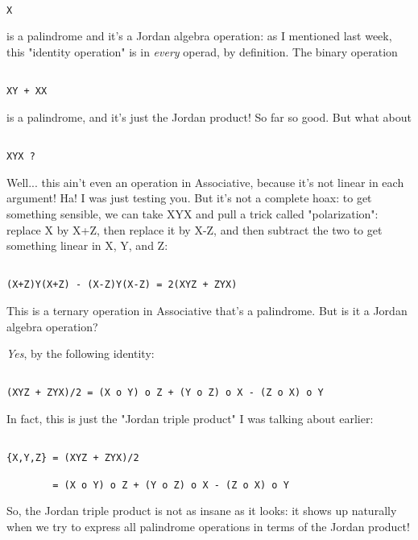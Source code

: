 \begin{verbatim}

X
\end{verbatim}
    
is a palindrome and it's a Jordan algebra operation: as I mentioned last
week, this "identity operation" is in \emph{every} 
operad, by definition.
The binary operation


\begin{verbatim}

XY + XX
\end{verbatim}
    
is a palindrome, and it's just the Jordan product!  So far so good.  
But what about


\begin{verbatim}

XYX ?
\end{verbatim}
    
Well... this ain't even an operation in Associative, because it's not
linear in each argument!  Ha!  I was just testing you.  But it's not a
complete hoax: to get something sensible, we can take XYX and pull a
trick called "polarization": replace X by X+Z, then replace it
by X-Z, and then subtract the two to get something linear in X, Y, and
Z:


\begin{verbatim}

(X+Z)Y(X+Z) - (X-Z)Y(X-Z) = 2(XYZ + ZYX)
\end{verbatim}
    
This is a ternary operation in Associative that's a palindrome.
But is it a Jordan algebra operation?  

\emph{Yes}, by the following identity:


\begin{verbatim}

(XYZ + ZYX)/2 = (X o Y) o Z + (Y o Z) o X - (Z o X) o Y    
\end{verbatim}
    
In fact, this is just the "Jordan triple product" I was
talking about earlier:


\begin{verbatim}

{X,Y,Z} = (XYZ + ZYX)/2 

        = (X o Y) o Z + (Y o Z) o X - (Z o X) o Y    
\end{verbatim}
    
So, the Jordan triple product is not as insane as it looks: it 
shows up naturally when we try to express all palindrome operations 
in terms of the Jordan product!

